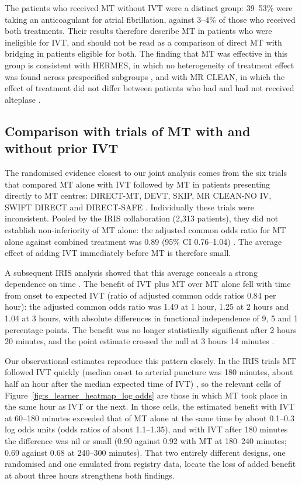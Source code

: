 The patients who received MT without IVT were a distinct group: 39--53\% were taking an anticoagulant for atrial fibrillation, against 3--4\% of those who received both treatments. Their results therefore describe MT in patients who were ineligible for IVT, and should not be read as a comparison of direct MT with bridging in patients eligible for both. The finding that MT was effective in this group is consistent with HERMES, in which no heterogeneity of treatment effect was found across prespecified subgroups , and with MR CLEAN, in which the effect of treatment did not differ between patients who had and had not received alteplase .

\subsection{Comparison with trials of MT with and without prior IVT}

The randomised evidence closest to our joint analysis comes from the six trials that compared MT alone with IVT followed by MT in patients presenting directly to MT centres: DIRECT-MT, DEVT, SKIP, MR CLEAN-NO IV, SWIFT DIRECT and DIRECT-SAFE . Individually these trials were inconsistent. Pooled by the IRIS collaboration (2,313 patients), they did not establish non-inferiority of MT alone: the adjusted common odds ratio for MT alone against combined treatment was 0.89 (95\% CI 0.76--1.04) . The average effect of adding IVT immediately before MT is therefore small.

A subsequent IRIS analysis showed that this average conceals a strong dependence on time . The benefit of IVT plus MT over MT alone fell with time from onset to expected IVT (ratio of adjusted common odds ratios 0.84 per hour): the adjusted common odds ratio was 1.49 at 1 hour, 1.25 at 2 hours and 1.04 at 3 hours, with absolute differences in functional independence of 9, 5 and 1 percentage points. The benefit was no longer statistically significant after 2 hours 20 minutes, and the point estimate crossed the null at 3 hours 14 minutes .

Our observational estimates reproduce this pattern closely. In the IRIS trials MT followed IVT quickly (median onset to arterial puncture was 180 minutes, about half an hour after the median expected time of IVT) , so the relevant cells of Figure~\ref{fig:s_learner_heatmap_log odds} are those in which MT took place in the same hour as IVT or the next. In those cells, the estimated benefit with IVT at 60--180 minutes exceeded that of MT alone at the same time by about 0.1--0.3 log odds units (odds ratios of about 1.1--1.35), and with IVT after 180 minutes the difference was nil or small (0.90 against 0.92 with MT at 180--240 minutes; 0.69 against 0.68 at 240--300 minutes). That two entirely different designs, one randomised and one emulated from registry data, locate the loss of added benefit at about three hours strengthens both findings.

